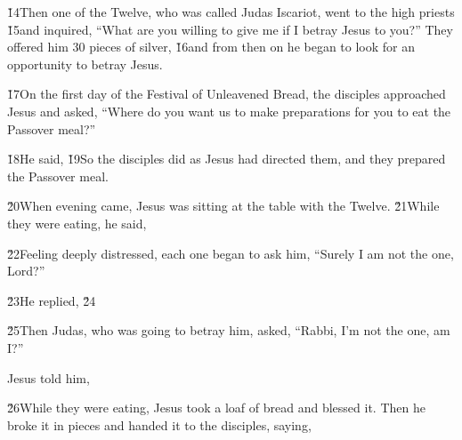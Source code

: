 \v{14}Then one of the Twelve, who was called Judas Iscariot, went to the high priests \v{15}and inquired, ``What are you willing to give me if I betray Jesus to you?'' They offered him 30 pieces of silver, \v{16}and from then on he began to look for an opportunity to betray Jesus.

\v{17}On the first day of the Festival of Unleavened Bread, the disciples approached Jesus and asked, ``Where do you want us to make preparations for you to eat the Passover meal?''

\v{18}He said,  \v{19}So the disciples did as Jesus had directed them, and they prepared the Passover meal.

\v{20}When evening came, Jesus was sitting at the table with the Twelve. \v{21}While they were eating, he said, 

\v{22}Feeling deeply distressed, each one began to ask him, ``Surely I am not the one, Lord?''

\v{23}He replied,  \v{24}

\v{25}Then Judas, who was going to betray him, asked, ``Rabbi, I'm not the one, am I?''

Jesus told him, 

\v{26}While they were eating, Jesus took a loaf of bread and blessed it. Then he broke it in pieces and handed it to the disciples, saying, 

